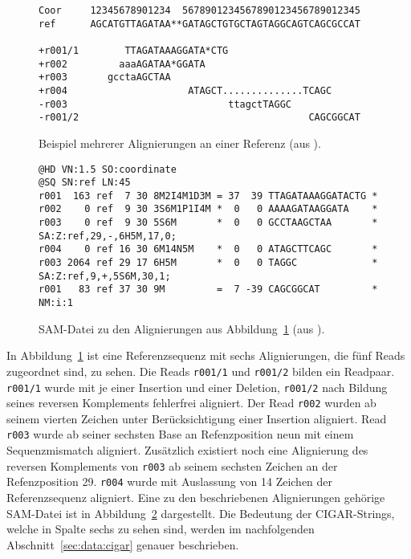 \begin{figure}[htbp]
    \begin{center}
    \begin{footnotesize}
\begin{BVerbatim}
Coor     12345678901234  5678901234567890123456789012345
ref      AGCATGTTAGATAA**GATAGCTGTGCTAGTAGGCAGTCAGCGCCAT

+r001/1        TTAGATAAAGGATA*CTG
+r002         aaaAGATAA*GGATA
+r003       gcctaAGCTAA
+r004                     ATAGCT..............TCAGC
-r003                            ttagctTAGGC
-r001/2                                        CAGCGGCAT
\end{BVerbatim}
    \end{footnotesize}
    \end{center}
    \caption{Beispiel mehrerer Alignierungen an einer Referenz (aus \citep{samspec}).}
    \label{fig:data:sam:align}
\end{figure}
\begin{figure}[htbp]
    \begin{center}
    \begin{footnotesize}
\begin{BVerbatim}
@HD VN:1.5 SO:coordinate
@SQ SN:ref LN:45
r001  163 ref  7 30 8M2I4M1D3M = 37  39 TTAGATAAAGGATACTG *
r002    0 ref  9 30 3S6M1P1I4M *  0   0 AAAAGATAAGGATA    *
r003    0 ref  9 30 5S6M       *  0   0 GCCTAAGCTAA       * SA:Z:ref,29,-,6H5M,17,0;
r004    0 ref 16 30 6M14N5M    *  0   0 ATAGCTTCAGC       *
r003 2064 ref 29 17 6H5M       *  0   0 TAGGC             * SA:Z:ref,9,+,5S6M,30,1;
r001   83 ref 37 30 9M         =  7 -39 CAGCGGCAT         * NM:i:1
\end{BVerbatim}
    \end{footnotesize}
    \end{center}
    \caption{SAM-Datei zu den Alignierungen aus Abbildung~\ref{fig:data:sam:align} (aus \citep{samspec}).}
    \label{fig:data:sam:file}
\end{figure}
In Abbildung~\ref{fig:data:sam:align} ist eine Referenzsequenz mit sechs Alignierungen, die fünf Reads zugeordnet sind, zu sehen.
Die Reads \texttt{r001/1} und \texttt{r001/2} bilden ein Readpaar.
\texttt{r001/1} wurde mit je einer Insertion und einer Deletion, \texttt{r001/2} nach Bildung seines reversen Komplements fehlerfrei aligniert.
Der Read \texttt{r002} wurden ab seinem vierten Zeichen unter Berücksichtigung einer Insertion aligniert.
Read \texttt{r003} wurde ab seiner sechsten Base an Refenzposition neun mit einem Sequenzmismatch aligniert.
Zusätzlich existiert noch eine Alignierung des reversen Komplements von \texttt{r003} ab seinem sechsten Zeichen an der Refenzposition 29.
\texttt{r004} wurde mit Auslassung von 14 Zeichen der Referenzsequenz aligniert.
Eine zu den beschriebenen Alignierungen gehörige SAM-Datei ist in Abbildung~\ref{fig:data:sam:file} dargestellt.
Die Bedeutung der CIGAR-Strings, welche in Spalte sechs zu sehen sind, werden im nachfolgenden Abschnitt~\ref{sec:data:cigar} genauer beschrieben.

